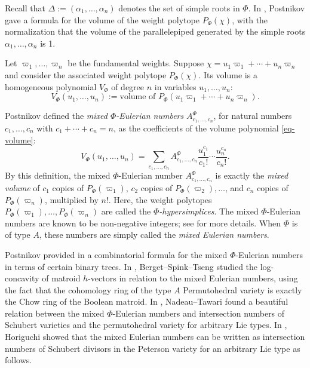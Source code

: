 \documentclass[11pt, letterpaper]{amsart}
\numberwithin{equation}{section}
\begin{document}
Recall that \(\Delta := (\alpha_1, \ldots, \alpha_n)\) denotes the set of simple roots in \(\Phi\). In \cite{postnikov2009permutohedra}, Postnikov gave a formula for the volume of the weight polytope \(P_\Phi(\chi)\), with the normalization that the volume of the parallelepiped generated by the simple roots \(\alpha_1, \ldots, \alpha_n\) is 1.

Let \(\varpi_1, \ldots, \varpi_n\) be the fundamental weights. Suppose \(\chi = u_1 \varpi_1 + \cdots + u_n \varpi_n\) and consider the associated weight polytope \(P_\Phi(\chi)\). Its volume is a homogeneous polynomial \(V_\Phi\) of degree \(n\) in variables \(u_1, \ldots, u_n\):
\begin{equation}\label{eq-volume}
   V_\Phi(u_1, \ldots, u_n) := \text{volume of } P_\Phi(u_1 \varpi_1 + \cdots + u_n \varpi_n). 
\end{equation}

Postnikov \cite{postnikov2009permutohedra} defined the \emph{mixed \(\Phi\)-Eulerian numbers} \(A_{c_1, \ldots, c_n}^\Phi\), for natural numbers \(c_1, \ldots, c_n \) with \(c_1 + \cdots + c_n = n\), as the coefficients of the volume polynomial \eqref{eq-volume}:
\begin{equation} \label{eq-def of MEN}
    V_\Phi(u_1, \ldots, u_n) = \sum_{c_1, \ldots, c_n} A_{c_1, \ldots, c_n}^\Phi \frac{u_1^{c_1}}{c_1!} \cdots \frac{u_n^{c_n}}{c_n!}.
\end{equation}
By this definition, the mixed $\Phi$-Eulerian number $A_{c_1,\ldots,c_n}^{\Phi}$ is exactly the \emph{mixed volume} of $c_1$ copies of $P_{\Phi}\left(\varpi_1\right)$, $c_2$ copies of $P_{\Phi}\left(\varpi_2\right), \ldots$, and $c_n$ copies of $P_{\Phi}\left(\varpi_n\right)$, multiplied by $n!$. Here, the weight polytopes $P_{\Phi}\left(\varpi_1\right), \ldots, P_{\Phi}\left(\varpi_n\right)$ are called the \emph{$\Phi$-hypersimplices}. The mixed $\Phi$-Eulerian numbers are known to be non-negative integers; see \cite{postnikov2009permutohedra} for more details. When $\Phi$ is of type $A$, these numbers are simply called the \emph{mixed Eulerian numbers}.

Postnikov provided in \cite{postnikov2009permutohedra} a combinatorial formula for the mixed $\Phi$-Eulerian numbers in terms of certain binary trees. In \cite{Berget2023log}, Berget--Spink--Tseng studied the log-concavity of matroid $h$-vectors in relation to the mixed Eulerian numbers, using the fact that the cohomology ring of the type $A$ Permutohedral variety is exactly the Chow ring of the Boolean matroid. In \cite{Nadeau2023permutahedral}, Nadeau--Tawari found a beautiful relation between the mixed $\Phi$-Eulerian numbers and intersection numbers of Schubert varieties and the permutohedral variety for arbitrary Lie types. In \cite{Horiguchi2024mixed}, Horiguchi showed that the mixed Eulerian numbers can be written as intersection numbers of Schubert divisors in the Peterson variety for an arbitrary Lie type as follows.
\end{document}
